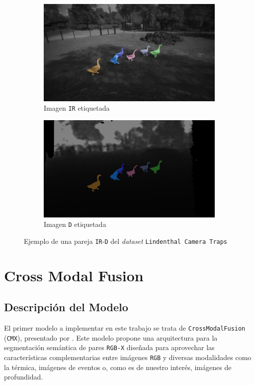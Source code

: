 \documentclass[12pt,a4paper]{report}
\begin{document}
\begin{figure}[!h]
    \centering
    \begin{subfigure}{0.45\textwidth}
        \centering
        \includegraphics[width=\textwidth]{media/data/mask_gueese_ir.png}
        \caption{Imagen \texttt{IR} etiquetada}
    \end{subfigure}
    \hfill
    \begin{subfigure}{0.45\textwidth}
        \centering
        \includegraphics[width=\textwidth]{media/data/mask_gueese_de.png}
        \caption{Imagen \texttt{D} etiquetada}
    \end{subfigure}
    \caption{Ejemplo de una pareja \texttt{IR}-\texttt{D} del \textit{dataset} \texttt{Lindenthal Camera Traps}}
    \label{fig:tagged-example}
\end{figure}

\chapter{Cross Modal Fusion}
\label{chap:cmx}
\section{Descripción del Modelo}
\label{sec:cmx_description}
El primer modelo a implementar en este trabajo se trata de \texttt{CrossModalFusion} (\texttt{CMX}), presentado por \cite{zhang2023cmxcrossmodalfusionrgbx}. Este modelo propone una arquitectura para la segmentación semántica de pares \texttt{RGB-X} diseñada para aprovechar las características complementarias entre imágenes \texttt{RGB} y diversas modalidades como la térmica, imágenes de eventos o, como es de nuestro interés, imágenes de profundidad.
\end{document}
